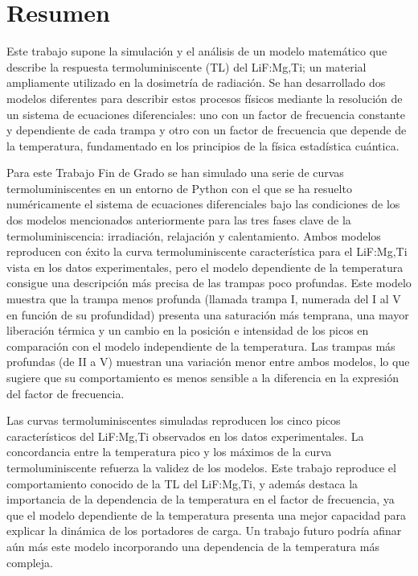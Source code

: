 \chapter*{Resumen}

Este trabajo supone la simulación y el análisis de un modelo matemático que describe la respuesta termoluminiscente (TL) del LiF:Mg,Ti; un material ampliamente utilizado en la dosimetría de radiación. Se han desarrollado dos modelos diferentes para describir estos procesos físicos mediante la resolución de un sistema de ecuaciones diferenciales: uno con un factor de frecuencia constante y dependiente de cada trampa y otro con un factor de frecuencia que depende de la temperatura, fundamentado en los principios de la física estadística cuántica.

\vspace{10pt}

Para este Trabajo Fin de Grado se han simulado una serie de curvas termoluminiscentes en un entorno de Python con el que se ha resuelto numéricamente el sistema de ecuaciones diferenciales bajo las condiciones de los dos modelos mencionados anteriormente para las tres fases clave de la termoluminiscencia: irradiación, relajación y calentamiento. Ambos modelos reproducen con éxito la curva termoluminiscente característica para el LiF:Mg,Ti vista en los datos experimentales, pero el modelo dependiente de la temperatura consigue una descripción más precisa de las trampas poco profundas. Este modelo muestra que la trampa menos profunda (llamada trampa I, numerada del I al V en función de su profundidad) presenta una saturación más temprana, una mayor liberación térmica y un cambio en la posición e intensidad de los picos en comparación con el modelo independiente de la temperatura. Las trampas más profundas (de II a V) muestran una variación menor entre ambos modelos, lo que sugiere que su comportamiento es menos sensible a la diferencia en la expresión del factor de frecuencia.

\vspace{10pt}

Las curvas termoluminiscentes simuladas reproducen los cinco picos característicos del LiF:Mg,Ti observados en los datos experimentales. La concordancia entre la temperatura pico y los máximos de la curva termoluminiscente refuerza la validez de los modelos. Este trabajo reproduce el comportamiento conocido de la TL del LiF:Mg,Ti, y además destaca la importancia de la dependencia de la temperatura en el factor de frecuencia, ya que el modelo dependiente de la temperatura presenta una mejor capacidad para explicar la dinámica de los portadores de carga. Un trabajo futuro podría afinar aún más este modelo incorporando una dependencia de la temperatura más compleja.



